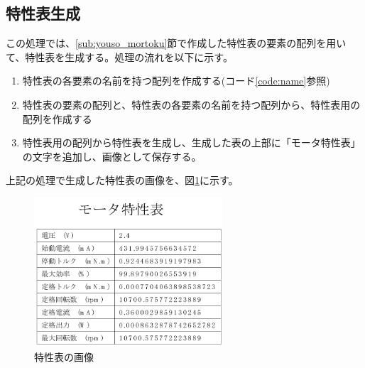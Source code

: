 \subsection{特性表生成}\label{sub:mortortoku}
この処理では、\ref{sub:youso_mortoku}節で作成した特性表の要素の配列を用いて、特性表を生成する。処理の流れを以下に示す。
\begin{enumerate}
    \item 特性表の各要素の名前を持つ配列を作成する(コード\ref{code:name}参照)
    \item 特性表の要素の配列と、特性表の各要素の名前を持つ配列から、特性表用の配列を作成する
    \item 特性表用の配列から特性表を生成し、生成した表の上部に「モータ特性表」の文字を追加し、画像として保存する。
\end{enumerate}
上記の処理で生成した特性表の画像を、図\ref{fig:toku_gazou}に示す。
\begin{figure}[t]
	
\end{figure}
\begin{figure}[t]
	\centering
	\includegraphics[width=7cm]{./Image/characteristicTable.png}
	\caption{特性表の画像}
	\label{fig:toku_gazou}
\end{figure}
